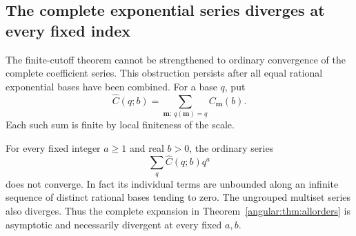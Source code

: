 \subsection{The complete exponential series diverges at every fixed index}
\label{angular:sec:divergence}

The finite-cutoff theorem cannot be strengthened to ordinary convergence
of the complete coefficient series. This obstruction persists after
all equal rational exponential bases have been combined.
For a base $q$, put
\[
 \widehat C(q;b)=\sum_{\mathbf m:\,q(\mathbf m)=q}C_{\mathbf m}(b).
\]
Each such sum is finite by local finiteness of the scale.

\begin{theorem}
\label{angular:thm:divergence}
For every fixed integer $a\ge1$ and real $b>0$, the ordinary series
\[
 \sum_q\widehat C(q;b)q^a
\]
does not converge. In fact its individual terms are unbounded along
an infinite sequence of distinct rational bases tending to zero.
The ungrouped multiset series also diverges. Thus the complete
expansion in Theorem~\ref{angular:thm:allorders} is asymptotic and
necessarily divergent at every fixed $a,b$.
\end{theorem}
